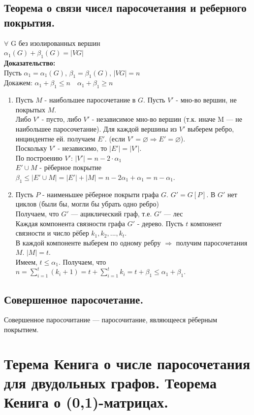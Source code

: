 \documentclass[12pt]{article}
\begin{document}
	\subsection{Теорема о связи чисел паросочетания и реберного покрытия.}
		$\forall$ G без изолированных вершин\\
		$\alpha_1(G) + \beta_1(G) = |VG|$\\
		\textbf{Доказательство:}\\
			Пусть $\alpha_1 = \alpha_1(G), \, \beta_1 = \beta_1(G), \, |VG|=n$\\
		Докажем: $\alpha_1 + \beta_1 \le n \quad \alpha_1 + \beta_1 \ge n$
		\begin{enumerate}
			\item Пусть $M$ - наибольшее паросочетание в $G$. Пусть $V'$ - мно-во вершин, не покрытых $M$. \\
				Либо $V'$ - пусто, либо $V'$ - независимое мно-во вершин (т.к. иначе M — не наибольшее паросочетание). Для каждой вершины из $V'$ выберем ребро, инциндентне ей. получаем $E'$. (если $V' = \varnothing  \Rightarrow E' = \varnothing$).\\
				Поскольку $V'$ - независимо, то $|E'| = |V'|$.\\
				По построению $V'$: $|V'| = n - 2 \cdot \alpha_1$\\
				$E' \cup M$ - рёберное покрытие $\beta_1 \le |E' \cup M| = |E'| + |M| = n - 2\alpha_1 + \alpha_1 = n - \alpha_1$.
			\item Пусть $P$ - наименьшее рёберное покрыти графа $G$. $G' = G[P]$. В $G'$ нет циклов (были бы, могли бы убрать одно ребро)\\
				Получаем, что $G'$ — ациклический граф, т.е. $G'$ — лес\\
				Каждая компонента связности графа $G'$ - дерево. Пусть $t$ компонент связности и число рёбер $k_1, k_2, ..., k_t$.\\
				В каждой компоненте выберем по одному ребру $ \Rightarrow $ получим паросочетания $M$. $|M| = t$.\\
				Имеем, $t \le \alpha_1$. Получаем, что $ \displaystyle n = \sum_{i=1}^t (k_i + 1) = t + \sum_{i=1}^t k_i = t + \beta_1 \le \alpha_1 + \beta_1$.
		\end{enumerate}
		\qedsymbol
	\subsection{Совершенное паросочетание.}
		Совершенное паросочитание — паросочитание, являющееся рёберным покрытием.
\section{Терема Кенига о числе паросочетания для двудольных графов. Теорема Кенига о (0,1)-матрицах.}
\end{document}
